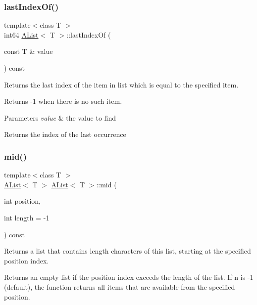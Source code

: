 \subsubsection{\texorpdfstring{lastIndexOf()}{lastIndexOf()}}
{\footnotesize\ttfamily template$<$class T $>$ \\
int64 \mbox{\hyperlink{class_a_list}{A\+List}}$<$ T $>$\+::last\+Index\+Of (\begin{DoxyParamCaption}\item[{const T \&}]{value }\end{DoxyParamCaption}) const}



Returns the last index of the item in list which is equal to the specified item. 

Returns -\/1 when there is no such item.


\begin{DoxyParams}{Parameters}
{\em value} & the value to find \\
\hline
\end{DoxyParams}
\begin{DoxyReturn}{Returns}
the index of the last occurrence 
\end{DoxyReturn}
\mbox{\label{class_a_list_a7b9c07f197f9017a7d231a8cf2f19f7b}} 
\subsubsection{\texorpdfstring{mid()}{mid()}}
{\footnotesize\ttfamily template$<$class T $>$ \\
\mbox{\hyperlink{class_a_list}{A\+List}}$<$ T $>$ \mbox{\hyperlink{class_a_list}{A\+List}}$<$ T $>$\+::mid (\begin{DoxyParamCaption}\item[{int}]{position,  }\item[{int}]{length = {\ttfamily -\/1} }\end{DoxyParamCaption}) const}



Returns a list that contains length characters of this list, starting at the specified position index. 

Returns an empty list if the position index exceeds the length of the list. If n is -\/1 (default), the function returns all items that are available from the specified position.


